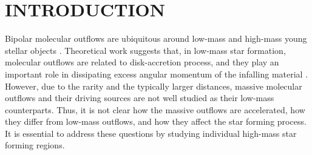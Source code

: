 \section{INTRODUCTION}
Bipolar molecular outflows are ubiquitous around low-mass and high-mass young stellar objects \citep{ 1985ARA&A..23..267L,1993prpl.conf..603F,2001ApJ...552L.167Z,2002A&A...383..892B,2015MNRAS.453..645M}. Theoretical work suggests that, in low-mass star formation, molecular outflows are related to disk-accretion process, and they play an important role in dissipating excess angular momentum of the infalling material \citep{1987ARA&A..25...23S, 1996ARA&A..34..111B}. However, due to the rarity and the typically larger distances, massive molecular outflows and their driving sources are not well studied as their low-mass counterparts. Thus, it is not clear how the massive outflows are accelerated, how they differ from low-mass outflows, and how they affect the star forming process. It is essential to address these questions by studying individual high-mass star forming regions. 

